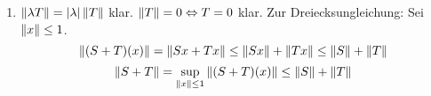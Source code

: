 \begin{beweis}
	\begin{enumerate}
		\item $ \left\|\lambda T\right\|=|\lambda|\left\|T\right\| $ klar. $ \left\|T\right\|=0\Leftrightarrow T=0 $ klar. Zur Dreiecksungleichung: Sei $ \left\|x\right\|\leq 1 $.
		\[ \left\|(S+T)(x)\right\|=\left\|Sx+Tx\right\|\leq\left\|Sx\right\|+\left\|Tx\right\|\leq\left\|S\right\|+\left\|T\right\| \]
		\[ \left\|S+T\right\|=\sup_{\left\|x\right\|\leq 1}\left\|(S+T)(x)\right\|\leq\left\|S\right\|+\left\|T\right\| \]
	\end{enumerate}
\end{beweis}